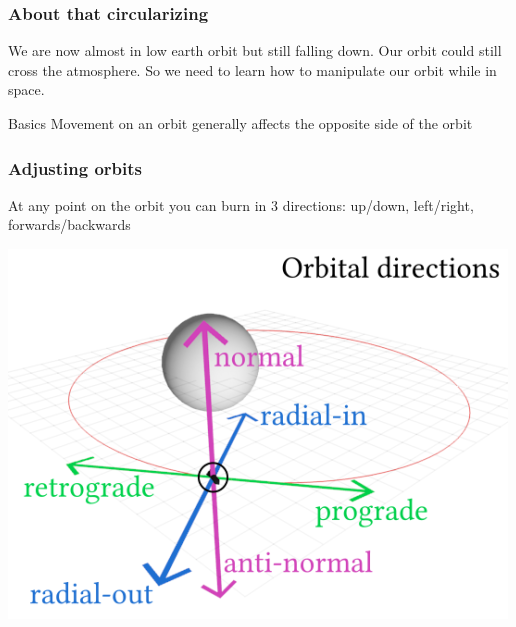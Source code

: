 {
%
\begin{frame}
\end{frame}
\begin{frame}
    \frametitle{About that circularizing}
    \begin{block}{}
        We are now almost in low earth orbit but still falling down. Our orbit could still cross the atmosphere.
        So we need to learn how to manipulate our orbit while in space.
    \end{block}
    \begin{block}{Basics}
        Movement on an orbit generally affects the opposite side of the orbit
    \end{block}
\end{frame}
\begin{frame}
    \frametitle{Adjusting orbits}
    \begin{block}{}
        \begin{center}
            At any point on the orbit you can burn in 3 directions: up/down, left/right, forwards/backwards
        \end{center}
    \end{block}
    \begin{block}{}
        \begin{center}
            \includegraphics[scale=0.4]{images/maneuver_node}

\end{center}
\end{block}
\end{frame}}
